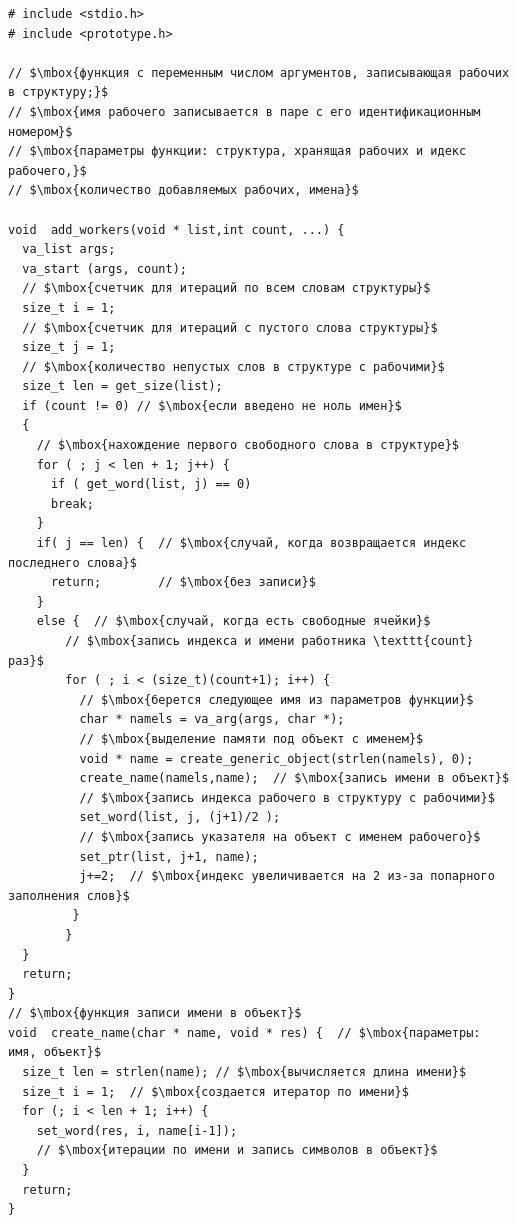 \begin{lstlisting}[mathescape]
# include <stdio.h>
# include <prototype.h>

// $\mbox{функция с переменным числом аргументов, записывающая рабочих в структуру;}$
// $\mbox{имя рабочего записывается в паре с его идентификационным номером}$
// $\mbox{параметры функции: структура, хранящая рабочих и идекс рабочего,}$
// $\mbox{количество добавляемых рабочих, имена}$

void  add_workers(void * list,int count, ...) { 
  va_list args;                                 
  va_start (args, count);
  // $\mbox{счетчик для итераций по всем словам структуры}$
  size_t i = 1;
  // $\mbox{счетчик для итераций с пустого слова структуры}$
  size_t j = 1;
  // $\mbox{количество непустых слов в структуре с рабочими}$
  size_t len = get_size(list);
  if (count != 0) // $\mbox{если введено не ноль имен}$
  {
    // $\mbox{нахождение первого свободного слова в структуре}$
    for ( ; j < len + 1; j++) {  
      if ( get_word(list, j) == 0)  
      break;
    }
    if( j == len) {  // $\mbox{случай, когда возвращается индекс последнего слова}$
      return;        // $\mbox{без записи}$
    }
    else {  // $\mbox{случай, когда есть свободные ячейки}$
        // $\mbox{запись индекса и имени работника \texttt{count} раз}$
        for ( ; i < (size_t)(count+1); i++) {
          // $\mbox{берется следующее имя из параметров функции}$
          char * namels = va_arg(args, char *);
          // $\mbox{выделение памяти под объект с именем}$
          void * name = create_generic_object(strlen(namels), 0);  
          create_name(namels,name);  // $\mbox{запись имени в объект}$
          // $\mbox{запись индекса рабочего в структуру с рабочими}$
          set_word(list, j, (j+1)/2 );
          // $\mbox{запись указателя на объект с именем рабочего}$
          set_ptr(list, j+1, name);  
          j+=2;  // $\mbox{индекс увеличивается на 2 из-за попарного заполнения слов}$
         }
        }
  }
  return;
}
// $\mbox{функция записи имени в объект}$
void  create_name(char * name, void * res) {  // $\mbox{параметры: имя, объект}$
  size_t len = strlen(name); // $\mbox{вычисляется длина имени}$
  size_t i = 1;  // $\mbox{создается итератор по имени}$
  for (; i < len + 1; i++) {
    set_word(res, i, name[i-1]);  
    // $\mbox{итерации по имени и запись символов в объект}$
  }
  return;
}


\end{lstlisting}
